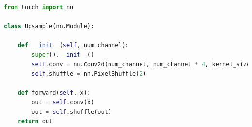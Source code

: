 \documentclass[../report.tex]{subfiles}
\begin{document}
\begin{lstlisting}[style=python, language=python, label={lst:Upsample}, caption={Upsample implementation}]
from torch import nn
	
class Upsample(nn.Module):
	
	def __init__(self, num_channel):
		super().__init__()
		self.conv = nn.Conv2d(num_channel, num_channel * 4, kernel_size=3, padding=1)
		self.shuffle = nn.PixelShuffle(2)
	
	def forward(self, x):
		out = self.conv(x)
		out = self.shuffle(out)
	return out
\end{lstlisting}
\end{document}
